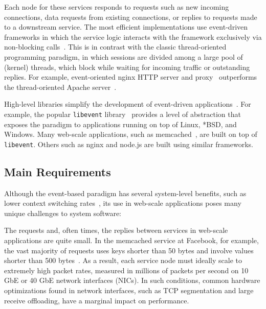 Each node for these services responds to requests such as new incoming
connections, data requests from existing connections, or replies to
requests made to a downstream service.  The most efficient
implementations use event-driven frameworks in which the service logic
interacts with the framework exclusively via non-blocking
calls~\cite{DBLP:conf/usenix/PaiDZ99,missing,missing}. This is in
contrast with the classic thread-oriented programming paradigm, in
which sessions are divided among a large pool of (kernel) threads,
which block while waiting for incoming traffic or outstanding
replies. For example, event-oriented nginx HTTP server and
proxy~\cite{reese2008nginx} outperforms the thread-oriented Apache
server~\cite{misc:apache}.

High-level libraries simplify the development of event-driven
applications~\cite{provos2003libevent,libev,libuv}.  For example, the
popular \texttt{libevent} library~\cite{provos2003libevent} provides a
level of abstraction that exposes the paradigm to applications running
on top of Linux, *BSD, and Windows.  Many web-scale applications, such
as memcached~\cite{missing}, are built on top of \texttt{libevent}.  Others
such as nginx and node.js are built using similar frameworks.


\subsection{Main Requirements}
\label{sec:motivation:challenges}

Although the event-based paradigm has several system-level benefits,
such as lower context switching rates~\cite{missing}, its use in web-scale
applications poses many unique challenges to system software:

 The requests and, often times, the replies
between services in web-scale applications are quite small. In the
memcached service at Facebook, for example, the vast majority of
requests uses keys shorter than 50 bytes and involve values shorter
than 500 bytes~\cite{Atikoglu:2012:WAL}. As a result, each service
node must ideally scale to extremely high packet rates, measured in
millions of packets per second on 10 GbE or 40 GbE network interfaces (NICs).
In such conditions, common hardware optimizations found in network
interfaces, such as TCP segmentation and large receive offloading,
have a marginal impact on performance. 

